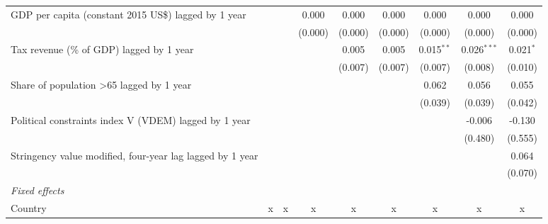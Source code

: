 \begin{tabular}{lcccccccc}
   GDP per capita (constant 2015 US\$) lagged by 1 year      &                &                & 0.000          & 0.000          & 0.000          & 0.000          & 0.000          & 0.000\\   
                                                             &                &                & (0.000)        & (0.000)        & (0.000)        & (0.000)        & (0.000)        & (0.000)\\   
   Tax revenue (\% of GDP) lagged by 1 year                  &                &                &                & 0.005          & 0.005          & 0.015$^{**}$   & 0.026$^{***}$  & 0.021$^{*}$\\   
                                                             &                &                &                & (0.007)        & (0.007)        & (0.007)        & (0.008)        & (0.010)\\   
   Share of population >65 lagged by 1 year                  &                &                &                &                &                & 0.062          & 0.056          & 0.055\\   
                                                             &                &                &                &                &                & (0.039)        & (0.039)        & (0.042)\\   
   Political constraints index V (VDEM) lagged by 1 year     &                &                &                &                &                &                & -0.006         & -0.130\\   
                                                             &                &                &                &                &                &                & (0.480)        & (0.555)\\   
   Stringency value modified, four-year lag lagged by 1 year &                &                &                &                &                &                &                & 0.064\\   
                                                             &                &                &                &                &                &                &                & (0.070)\\   
   \emph{Fixed effects}\\
   Country                                                   & x              & x              & x              & x              & x              & x              & x              & x\\  

\end{tabular}
